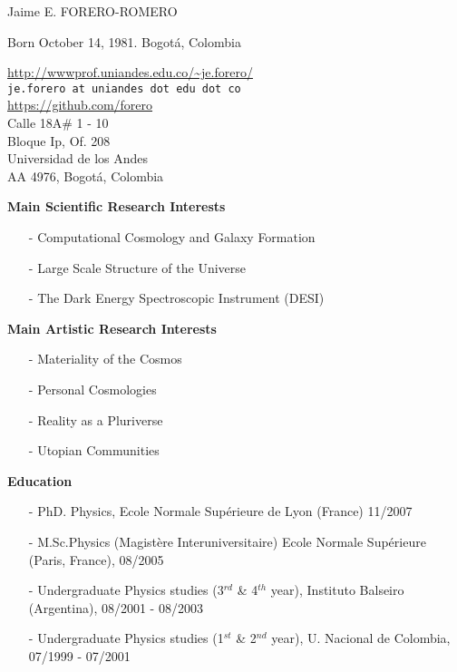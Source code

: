 \documentclass[letterpaper,11pt,onecolumn]{article}
\begin{document}
\noindent

\noindent
{{\Large Jaime E. FORERO-ROMERO}}\\
\begin{flushleft}
Born October 14, 1981. Bogot\'a, Colombia\\
\end{flushleft}
\begin{flushright}
\url{http://wwwprof.uniandes.edu.co/~je.forero/} \\{\tt{je.forero at uniandes dot edu dot co}}\\
\url{https://github.com/forero}\\
Calle 18A\# 1 - 10\\
Bloque Ip, Of. 208\\
Universidad de los Andes\\
AA 4976, Bogot\'a, Colombia\\
\end{flushright}


{\bf Main Scientific Research Interests}
\begin{itemize}
\item[-]{Computational Cosmology and Galaxy Formation}
\item[-]{Large Scale Structure of the Universe}
\item[-]{The Dark Energy Spectroscopic Instrument (DESI)}
\end{itemize}

{\bf Main Artistic Research Interests}
\begin{itemize}
\item[-]{Materiality of the Cosmos}
\item[-]{Personal Cosmologies}
\item[-]{Reality as a Pluriverse}
\item[-]{Utopian Communities}
\end{itemize}

{\bf Education}
\indent
\begin{itemize}
\item[-] PhD. Physics, Ecole Normale Sup\'erieure de Lyon (France) 11/2007
\item[-] M.Sc.Physics (Magist\`ere Interuniversitaire)  Ecole Normale
  Sup\'erieure (Paris, France), 08/2005
\item[-] Undergraduate Physics studies (3$^{rd}$ \& 4$^{th}$ year),
  Instituto Balseiro (Argentina), 08/2001 - 08/2003
\item[-] Undergraduate Physics studies (1$^{st}$ \& 2$^{nd}$ year),
  U. Nacional de Colombia, 07/1999 -  07/2001
\end{itemize}
\end{document}

